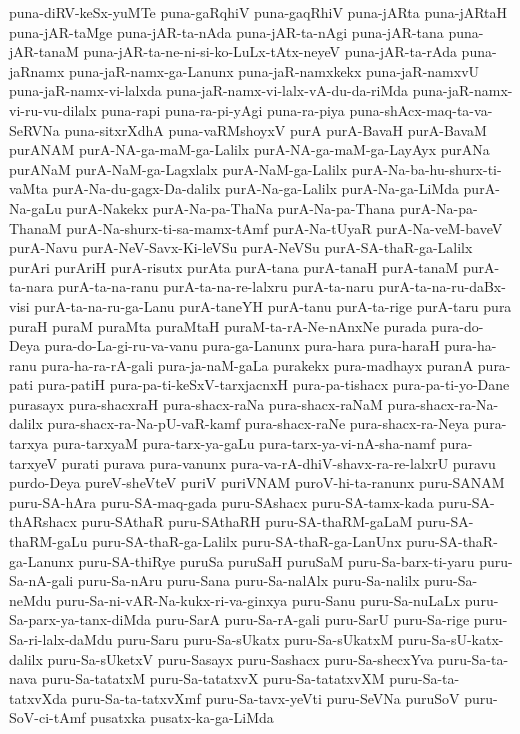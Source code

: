 {puna-diRV-keSx-yuMTe
puna-gaRqhiV
puna-gaqRhiV
puna-jARta
puna-jARtaH
puna-jAR-taMge
puna-jAR-ta-nAda
puna-jAR-ta-nAgi
puna-jAR-tana
puna-jAR-tanaM
puna-jAR-ta-ne-ni-si-ko-LuLx-tAtx-neyeV
puna-jAR-ta-rAda
puna-jaRnamx
puna-jaR-namx-ga-Lanunx
puna-jaR-namxkekx
puna-jaR-namxvU
puna-jaR-namx-vi-lalxda
puna-jaR-namx-vi-lalx-vA-du-da-riMda
puna-jaR-namx-vi-ru-vu-dilalx
puna-rapi
puna-ra-pi-yAgi
puna-ra-piya
puna-shAcx-maq-ta-va-SeRVNa
puna-sitxrXdhA
puna-vaRMshoyxV
purA
purA-BavaH
purA-BavaM
purANAM
purA-NA-ga-maM-ga-Lalilx
purA-NA-ga-maM-ga-LayAyx
purANa
purANaM
purA-NaM-ga-Lagxlalx
purA-NaM-ga-Lalilx
purA-Na-ba-hu-shurx-ti-vaMta
purA-Na-du-gagx-Da-dalilx
purA-Na-ga-Lalilx
purA-Na-ga-LiMda
purA-Na-gaLu
purA-Nakekx
purA-Na-pa-ThaNa
purA-Na-pa-Thana
purA-Na-pa-ThanaM
purA-Na-shurx-ti-sa-mamx-tAmf
purA-Na-tUyaR
purA-Na-veM-baveV
purA-Navu
purA-NeV-Savx-Ki-leVSu
purA-NeVSu
purA-SA-thaR-ga-Lalilx
purAri
purAriH
purA-risutx
purAta
purA-tana
purA-tanaH
purA-tanaM
purA-ta-nara
purA-ta-na-ranu
purA-ta-na-re-lalxru
purA-ta-naru
purA-ta-na-ru-daBx-visi
purA-ta-na-ru-ga-Lanu
purA-taneYH
purA-tanu
purA-ta-rige
purA-taru
pura
puraH
puraM
puraMta
puraMtaH
puraM-ta-rA-Ne-nAnxNe
purada
pura-do-Deya
pura-do-La-gi-ru-va-vanu
pura-ga-Lanunx
pura-hara
pura-haraH
pura-ha-ranu
pura-ha-ra-rA-gali
pura-ja-naM-gaLa
purakekx
pura-madhayx
puranA
pura-pati
pura-patiH
pura-pa-ti-keSxV-tarxjacnxH
pura-pa-tishacx
pura-pa-ti-yo-Dane
purasayx
pura-shacxraH
pura-shacx-raNa
pura-shacx-raNaM
pura-shacx-ra-Na-dalilx
pura-shacx-ra-Na-pU-vaR-kamf
pura-shacx-raNe
pura-shacx-ra-Neya
pura-tarxya
pura-tarxyaM
pura-tarx-ya-gaLu
pura-tarx-ya-vi-nA-sha-namf
pura-tarxyeV
purati
purava
pura-vanunx
pura-va-rA-dhiV-shavx-ra-re-lalxrU
puravu
purdo-Deya
pureV-sheVteV
puriV
puriVNAM
puroV-hi-ta-ranunx
puru-SANAM
puru-SA-hAra
puru-SA-maq-gada
puru-SAshacx
puru-SA-tamx-kada
puru-SA-thARshacx
puru-SAthaR
puru-SAthaRH
puru-SA-thaRM-gaLaM
puru-SA-thaRM-gaLu
puru-SA-thaR-ga-Lalilx
puru-SA-thaR-ga-LanUnx
puru-SA-thaR-ga-Lanunx
puru-SA-thiRye
puruSa
puruSaH
puruSaM
puru-Sa-barx-ti-yaru
puru-Sa-nA-gali
puru-Sa-nAru
puru-Sana
puru-Sa-nalAlx
puru-Sa-nalilx
puru-Sa-neMdu
puru-Sa-ni-vAR-Na-kukx-ri-va-ginxya
puru-Sanu
puru-Sa-nuLaLx
puru-Sa-parx-ya-tanx-diMda
puru-SarA
puru-Sa-rA-gali
puru-SarU
puru-Sa-rige
puru-Sa-ri-lalx-daMdu
puru-Saru
puru-Sa-sUkatx
puru-Sa-sUkatxM
puru-Sa-sU-katx-dalilx
puru-Sa-sUketxV
puru-Sasayx
puru-Sashacx
puru-Sa-shecxYva
puru-Sa-ta-nava
puru-Sa-tatatxM
puru-Sa-tatatxvX
puru-Sa-tatatxvXM
puru-Sa-ta-tatxvXda
puru-Sa-ta-tatxvXmf
puru-Sa-tavx-yeVti
puru-SeVNa
puruSoV
puru-SoV-ci-tAmf
pusatxka
pusatx-ka-ga-LiMda
}
